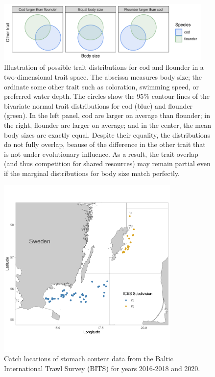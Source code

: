 \documentclass[9pt,twoside,lineno]{pnas-new}
\begin{document}
\begin{figure}
\centering
\includegraphics[width=0.95\textwidth]{fig-SI-overlap.pdf}
\caption{Illustration of possible trait distributions for cod and flounder in a two-dimensional trait space. The abscissa measures body size; the ordinate some other trait such as coloration, swimming speed, or preferred water depth. The circles show the 95\% contour lines of the bivariate normal trait distributions for cod (blue) and flounder (green). In the left panel, cod are larger on average than flounder; in the right, flounder are larger on average; and in the center, the mean body sizes are exactly equal. Despite their equality, the distributions do not fully overlap, beause of the difference in the other trait that is not under evolutionary influence. As a result, the trait overlap (and thus competition for shared resources) may remain partial even if the marginal distributions for body size match perfectly.}
\label{fig:overlap}
\end{figure}


\begin{figure}
\centering
\includegraphics[width=0.8\textwidth]{figs1.pdf}
\caption{Catch locations of stomach content data from the Baltic International Trawl Survey (BITS) for years 2016-2018 and 2020.}
\label{fig:si_map}
\end{figure}
\end{document}

